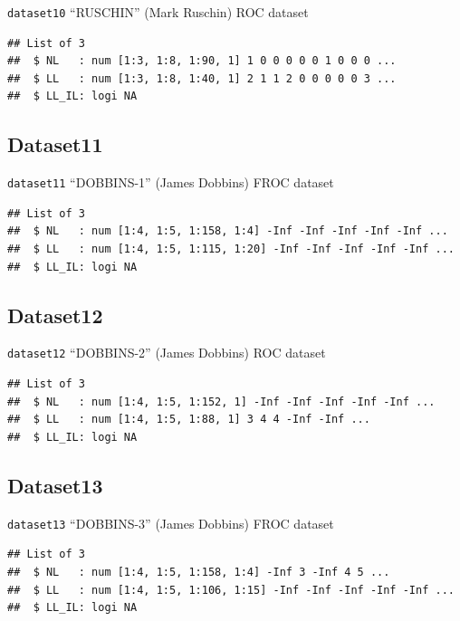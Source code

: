\documentclass[
]{book}
\begin{document}
\texttt{dataset10} ``RUSCHIN'' (Mark Ruschin) ROC dataset \citep{RN1646}

\begin{verbatim}
## List of 3
##  $ NL   : num [1:3, 1:8, 1:90, 1] 1 0 0 0 0 0 1 0 0 0 ...
##  $ LL   : num [1:3, 1:8, 1:40, 1] 2 1 1 2 0 0 0 0 0 3 ...
##  $ LL_IL: logi NA
\end{verbatim}

\hypertarget{datasets-dataset11}{%
\subsection{Dataset11}\label{datasets-dataset11}}

\texttt{dataset11} ``DOBBINS-1'' (James Dobbins) FROC dataset \citep{Dobbins2016MultiInstitutional}

\begin{verbatim}
## List of 3
##  $ NL   : num [1:4, 1:5, 1:158, 1:4] -Inf -Inf -Inf -Inf -Inf ...
##  $ LL   : num [1:4, 1:5, 1:115, 1:20] -Inf -Inf -Inf -Inf -Inf ...
##  $ LL_IL: logi NA
\end{verbatim}

\hypertarget{datasets-dataset12}{%
\subsection{Dataset12}\label{datasets-dataset12}}

\texttt{dataset12} ``DOBBINS-2'' (James Dobbins) ROC dataset \citep{Dobbins2016MultiInstitutional}

\begin{verbatim}
## List of 3
##  $ NL   : num [1:4, 1:5, 1:152, 1] -Inf -Inf -Inf -Inf -Inf ...
##  $ LL   : num [1:4, 1:5, 1:88, 1] 3 4 4 -Inf -Inf ...
##  $ LL_IL: logi NA
\end{verbatim}

\hypertarget{datasets-dataset13}{%
\subsection{Dataset13}\label{datasets-dataset13}}

\texttt{dataset13} ``DOBBINS-3'' (James Dobbins) FROC dataset \citep{Dobbins2016MultiInstitutional}

\begin{verbatim}
## List of 3
##  $ NL   : num [1:4, 1:5, 1:158, 1:4] -Inf 3 -Inf 4 5 ...
##  $ LL   : num [1:4, 1:5, 1:106, 1:15] -Inf -Inf -Inf -Inf -Inf ...
##  $ LL_IL: logi NA
\end{verbatim}
\end{document}
